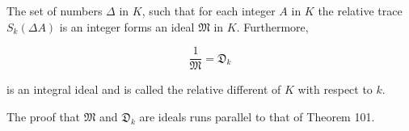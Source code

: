 The set of numbers $\Delta$ in $K$, such that for each integer $A$ in $K$ the relative trace $S_k(\Delta A)$ is an integer forms an ideal $\mathfrak{M}$ in $K$. Furthermore,

$$\frac{1}{\mathfrak{M}} = \mathfrak{D}_k$$

is an integral ideal and is called the relative different of $K$ with respect to $k$.

The proof that $\mathfrak{M}$ and $\mathfrak{D}_k$ are ideals runs parallel to that of Theorem 101.
